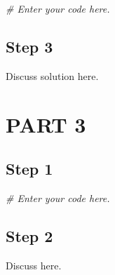 \documentclass[
]{article}
\newenvironment{Shaded}{\begin{snugshade}}{\end{snugshade}}
\newcommand{\CommentTok}[1]{\textcolor[rgb]{0.56,0.35,0.01}{\textit{#1}}}
\begin{document}
\begin{Shaded}
\begin{Highlighting}[]
\CommentTok{\# Enter your code here.}
\end{Highlighting}
\end{Shaded}

\hypertarget{step-3}{%
\subsection{Step 3}\label{step-3}}

Discuss solution here.

\hypertarget{part-3}{%
\section{PART 3}\label{part-3}}

\hypertarget{step-1-1}{%
\subsection{Step 1}\label{step-1-1}}

\begin{Shaded}
\begin{Highlighting}[]
\CommentTok{\# Enter your code here.}
\end{Highlighting}
\end{Shaded}

\hypertarget{step-2-1}{%
\subsection{Step 2}\label{step-2-1}}

Discuss here.
\end{document}
